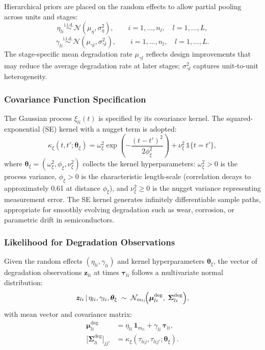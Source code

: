 \documentclass[a4paper,fleqn,longmktitle]{cas-sc}
\newcommand{\given}{\,|\,}
\newcommand{\iid}{\overset{\text{i.i.d.}}{\sim}}
\newcommand{\normal}{\mathcal{N}}
\begin{document}
Hierarchical priors are placed on the random effects to allow partial pooling across units and stages:
\begin{equation}\label{eq:eta_prior}
    \eta_{li} \iid \normal(\mu_\eta, \sigma_\eta^2), \qquad i = 1, \ldots, n_l, \quad l = 1, \ldots, L,
\end{equation}
\begin{equation}\label{eq:gamma_prior}
    \gamma_{li} \iid \normal(\mu_{\gamma l}, \sigma_{\gamma l}^2), \qquad i = 1, \ldots, n_l, \quad l = 1, \ldots, L.
\end{equation}
The stage-specific mean degradation rate $\mu_{\gamma l}$ reflects design improvements that may reduce the average degradation rate at later stages; $\sigma_{\gamma l}^2$ captures unit-to-unit heterogeneity.

\subsubsection{Covariance Function Specification}

The Gaussian process $\xi_{li}(t)$ is specified by its covariance kernel. The squared-exponential (SE) kernel with a nugget term is adopted:
\begin{equation}\label{eq:se_kernel}
    \kappa_\xi(t, t'; \bm{\theta}_\xi) = \omega_\xi^2 \exp\!\left(-\frac{(t - t')^2}{2\phi_\xi^2}\right) + \nu_\xi^2 \,\mathbb{1}\{t = t'\},
\end{equation}
where $\bm{\theta}_\xi = (\omega_\xi^2, \phi_\xi, \nu_\xi^2)$ collects the kernel hyperparameters: $\omega_\xi^2 > 0$ is the process variance, $\phi_\xi > 0$ is the characteristic length-scale (correlation decays to approximately 0.61 at distance $\phi_\xi$), and $\nu_\xi^2 \geq 0$ is the nugget variance representing measurement error. The SE kernel generates infinitely differentiable sample paths, appropriate for smoothly evolving degradation such as wear, corrosion, or parametric drift in semiconductors.

\subsubsection{Likelihood for Degradation Observations}

Given the random effects $(\eta_{li}, \gamma_{li})$ and kernel hyperparameters $\bm{\theta}_\xi$, the vector of degradation observations $\bm{z}_{li}$ at times $\bm{\tau}_{li}$ follows a multivariate normal distribution:
\begin{equation}\label{eq:degrad_lik}
    \bm{z}_{li} \given \eta_{li}, \gamma_{li}, \bm{\theta}_\xi \;\sim\;
    \normal_{m_{li}}\!\Bigl(\bm{\mu}_{li}^{\text{deg}}, \; \bm{\Sigma}_{li}^{\text{deg}}\Bigr),
\end{equation}
with mean vector and covariance matrix:
\begin{align}
    \bm{\mu}_{li}^{\text{deg}} &= \eta_{li}\,\bm{1}_{m_{li}} + \gamma_{li}\,\bm{\tau}_{li}, \label{eq:degrad_mean} \\
    \bigl[\bm{\Sigma}_{li}^{\text{deg}}\bigr]_{jj'} &= \kappa_\xi(\tau_{lij}, \tau_{lij'}; \bm{\theta}_\xi). \label{eq:degrad_cov}
\end{align}
\end{document}
